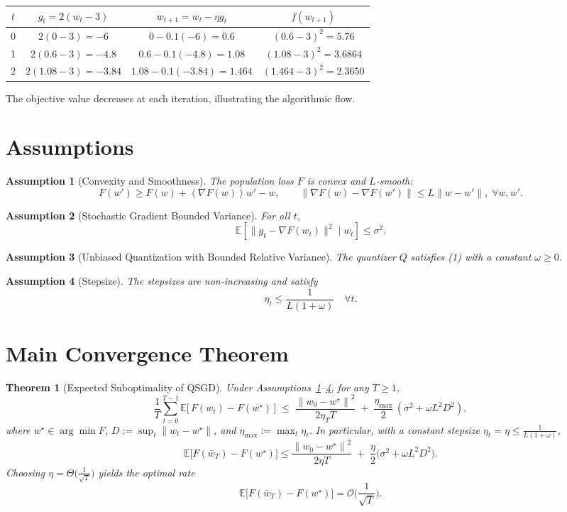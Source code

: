 \documentclass{article}
\newtheorem{theorem}{Theorem}
\newtheorem{assumption}{Assumption}
\newcommand{\EE}{\mathbb{E}}
\newcommand{\norm}[1]{\left\|#1\right\|}
\newcommand{\inner}[1]{\left\langle #1 \right\rangle}
\begin{document}
\begin{center}
\begin{tabular}{c|c|c|c}
$t$ & $g_t=2(w_t-3)$ & $w_{t+1}=w_t-\eta g_t$ & $f(w_{t+1})$ \\ \hline
0 & $2(0-3)=-6$ & $0-0.1(-6)=0.6$ & $(0.6-3)^2=5.76$\\
1 & $2(0.6-3)=-4.8$ & $0.6-0.1(-4.8)=1.08$ & $(1.08-3)^2=3.6864$\\
2 & $2(1.08-3)=-3.84$ & $1.08-0.1(-3.84)=1.464$ & $(1.464-3)^2=2.3650$\\
\end{tabular}
\end{center}
The objective value decreases at each iteration, illustrating the algorithmic flow.

\newpage
\section*{Assumptions}
\begin{assumption}[Convexity and Smoothness]\label{ass:convex}
The population loss $F$ is convex and $L$‑smooth:
\[
F(w')\ge F(w)+\inner{\nabla F(w)}{w'-w},\qquad 
\|\nabla F(w)-\nabla F(w')\|\le L\|w-w'\|,\;\forall w,w'.
\]
\end{assumption}
\begin{assumption}[Stochastic Gradient Bounded Variance]\label{ass:sgdvar}
For all $t$,
\[
\EE\!\left[\|g_t-\nabla F(w_t)\|^{2}\mid w_t\right]\le\sigma^{2}.
\]
\end{assumption}
\begin{assumption}[Unbiased Quantization with Bounded Relative Variance]\label{ass:quant}
The quantizer $Q$ satisfies (1) with a constant $\omega\ge0$.
\end{assumption}
\begin{assumption}[Stepsize]\label{ass:stepsize}
The stepsizes are non‑increasing and satisfy
\[
\eta_t\le \frac{1}{L(1+\omega)}\quad\forall t .
\]
\end{assumption}

\section*{Main Convergence Theorem}
\begin{theorem}[Expected Suboptimality of QSGD]\label{thm:main}
Under Assumptions~\ref{ass:convex}–\ref{ass:stepsize}, for any $T\ge1$,
\[
\frac1T\sum_{t=0}^{T-1}\EE\!\big[\,F(w_t)-F(w^{\star})\,\big]
\;\le\;
\frac{\norm{w_0-w^{\star}}^{2}}{2\eta_T T}
\;+\;
\frac{\eta_{\max}}{2}\,( \sigma^{2}+ \omega L^{2} D^{2}),
\tag{3}
\]
where $w^{\star}\in\arg\min F$, $D:=\sup_{t}\norm{w_t-w^{\star}}$, and $\eta_{\max}:=\max_{t}\eta_t$.
In particular, with a constant stepsize $\eta_t=\eta\le\frac{1}{L(1+\omega)}$,
\[
\EE\!\big[F(\bar w_T)-F(w^{\star})\big]\le
\frac{\norm{w_0-w^{\star}}^{2}}{2\eta T}
\;+\;
\frac{\eta}{2}\big(\sigma^{2}+\omega L^{2}D^{2}\big).
\tag{4}
\]
Choosing $\eta=\Theta\!\big(\frac{1}{\sqrt{T}}\big)$ yields the optimal rate
\[
\EE\!\big[F(\bar w_T)-F(w^{\star})\big]=\mathcal{O}\!\Big(\frac{1}{\sqrt{T}}\Big).
\]
\end{theorem}
\end{document}
